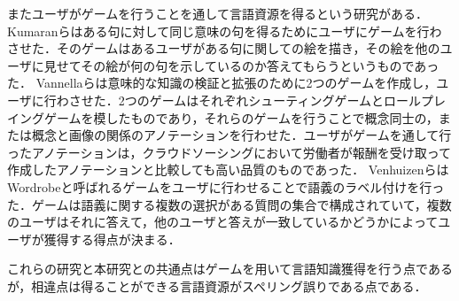 またユーザがゲームを行うことを通して言語資源を得るという研究がある．Kumaranらはある句に対して同じ意味の句を得るためにユーザにゲームを行わさせた\cite{kumaranCOLING2014}．そのゲームはあるユーザがある句に関しての絵を描き，その絵を他のユーザに見せてその絵が何の句を示しているのか答えてもらうというものであった．
Vannellaらは意味的な知識の検証と拡張のために2つのゲームを作成し，ユーザに行わさせた\cite{vannella2014validating}．2つのゲームはそれぞれシューティングゲームとロールプレイングゲームを模したものであり，それらのゲームを行うことで概念同士の，または概念と画像の関係のアノテーションを行わせた．ユーザがゲームを通して行ったアノテーションは，クラウドソーシングにおいて労働者が報酬を受け取って作成したアノテーションと比較しても高い品質のものであった．
VenhuizenらはWordrobeと呼ばれるゲームをユーザに行わせることで語義のラベル付けを行った\cite{venhuizen2013gamification}．ゲームは語義に関する複数の選択がある質問の集合で構成されていて，複数のユーザはそれに答えて，他のユーザと答えが一致しているかどうかによってユーザが獲得する得点が決まる．
\begin{comment}
得られたデータの量は比較的少なかったが，適合率と再現率の結果は期待できるものであるとしている．
\end{comment}
これらの研究と本研究との共通点はゲームを用いて言語知識獲得を行う点であるが，相違点は得ることができる言語資源がスペリング誤りである点である．